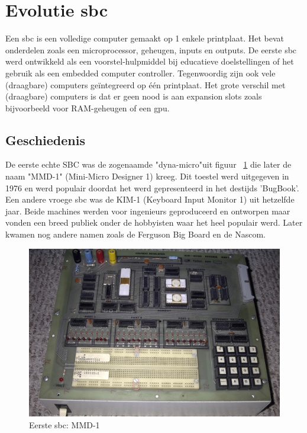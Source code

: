 \newpage	

\section{Evolutie \gls{sbc}}
Een \gls{sbc} is een volledige computer gemaakt op 1 enkele printplaat. Het bevat onderdelen zoals een microprocessor, geheugen, inputs en outputs. De eerste \gls{sbc} werd ontwikkeld als een voorstel-hulpmiddel bij educatieve doelstellingen of het gebruik als een embedded computer controller. Tegenwoordig zijn ook vele (draagbare) computers ge\"integreerd op \'e\'en printplaat. Het grote verschil met (draagbare) computers is dat er geen nood is aan expansion slots zoals bijvoorbeeld voor RAM-geheugen of een \gls{gpu}.
	\subsection{Geschiedenis}
	De eerste echte SBC was de zogenaamde "dyna-micro"\space uit figuur ~\ref{fig:eersteSBC} die later de naam "MMD-1" (Mini-Micro Designer 1) kreeg. Dit toestel werd uitgegeven in 1976 en werd populair doordat het werd gepresenteerd in het destijds 'BugBook'. Een andere vroege \gls{sbc} was de KIM-1 (Keyboard Input Monitor 1) uit hetzelfde jaar. Beide machines werden voor ingenieurs geproduceerd en ontworpen maar vonden een breed publiek onder de hobbyisten waar het heel populair werd. Later kwamen nog andere namen zoals de Ferguson Big Board en de Nascom.

	\begin{figure}
		\centering
		\includegraphics[width=120mm]{afbeeldingen/Early_1976_MMD1_Prototype_most_chips_removed.PNG}
		\caption{Eerste \gls{sbc}: MMD-1 \cite{bron:fotoeerstesbc}}
		\label{fig:eersteSBC}
	\end{figure}
	
